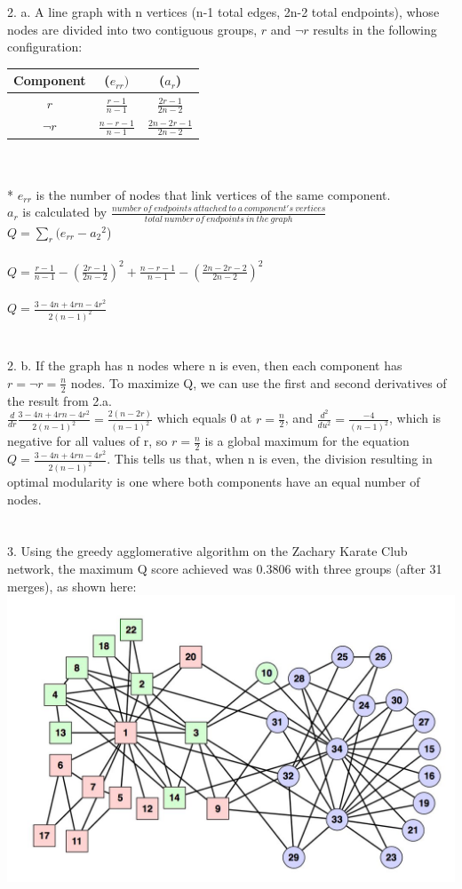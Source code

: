 \documentclass[11pt, oneside]{article}   	%
\begin{document}
 2. a.  A line graph with n vertices (n-1 total edges, 2n-2 total endpoints), whose nodes  are divided into two contiguous groups, $r$ and $\lnot r$ results in the following configuration:\\
 \begin{tabular}{|c|c|c|}
 \hline
 Component & ($e_{rr})$ & ($a_r$)\\
 \hline
 $r$ & $\frac{r-1}{n-1}$ & $\frac{2r-1}{2n-2}$\\
 \hline
 $\lnot r$ & $\frac{n-r-1}{n-1}$ & $\frac{2n-2r-1}{2n-2}$\\
 \hline
\end{tabular}
\\\\
* $e_{rr}$ is the number of nodes that link vertices of the same component.  \\
$a_r$ is calculated by $\frac{number\ of\ endpoints\ attached\ to\ a\ component's\ vertices}{total\ number\ of\ endpoints\ in\ the\ graph}$\\
$Q = \sum_r (e_{rr} - {a_2}^2$)\\\\
$Q= \frac{r-1}{n-1} - (\frac{2r-1}{2n-2})^2 + \frac{n-r-1}{n-1} - (\frac{2n-2r-2}{2n-2})^2$\\\\
$Q=\frac{3-4n+4rn-4r^2}{2(n-1)^2}$\\\\\\
2. b.  If the graph has n nodes where n is even, then each component has $r = \lnot r = \frac{n}{2}$ nodes.  To maximize Q, we can use the first and second derivatives of the result from 2.a.\\
$\frac{d}{dr} \frac{3-4n+4rn-4r^2}{2(n-1)^2}= \frac{2(n-2r)}{(n-1)^2}$ which equals 0 at $r = \frac{n}{2}$, and
$\frac{d^2}{du^2} = \frac{-4}{(n-1)^2}$, which is negative for all values of r, so $r=\frac{n}{2}$ is a global maximum for the  equation $Q = \frac{3-4n+4rn-4r^2}{2(n-1)^2}$.  This tells us that, when n is even, the division resulting in optimal modularity is one where both components have an equal number of nodes.\\\\\\
3.  Using the greedy agglomerative algorithm on the Zachary Karate Club network, the maximum Q score achieved was 0.3806 with three groups (after 31 merges), as shown here:\\  
\includegraphics[scale=.25]{karate.jpg}\\
\end{document}
